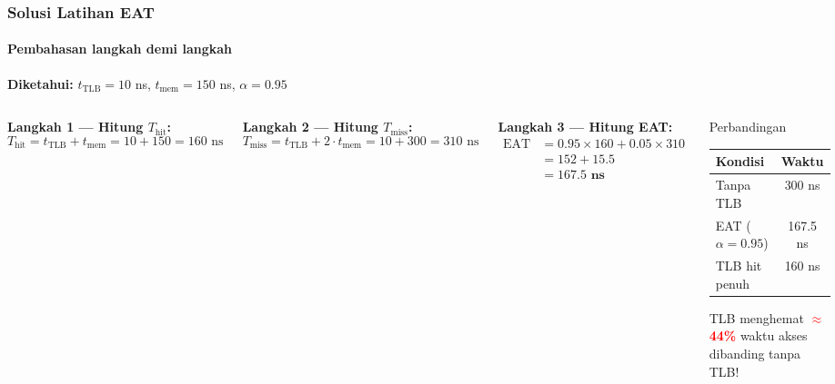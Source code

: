 \documentclass[t,aspectratio=169,xcolor=dvipsnames]{beamer}
\newcommand{\tem}[1]{\textbf{\textcolor{red}{#1}}}
\begin{document}
\begin{frame}
    \frametitle{Solusi Latihan EAT}
    \framesubtitle{Pembahasan langkah demi langkah}
    \small

    \textbf{Diketahui:} $t_{\text{TLB}} = 10$ ns, $t_{\text{mem}} = 150$ ns, $\alpha = 0.95$

    \vspace{0.2cm}
    \begin{columns}[T]
        \textbf{Langkah 1 — Hitung $T_{\text{hit}}$:}
        \[ T_{\text{hit}} = t_{\text{TLB}} + t_{\text{mem}} = 10 + 150 = 160 \text{ ns} \]

        \textbf{Langkah 2 — Hitung $T_{\text{miss}}$:}
        \[ T_{\text{miss}} = t_{\text{TLB}} + 2 \cdot t_{\text{mem}} = 10 + 300 = 310 \text{ ns} \]

        \textbf{Langkah 3 — Hitung EAT:}
        \begin{align*}
            \text{EAT} &= 0.95 \times 160 + 0.05 \times 310 \\
                       &= 152 + 15.5 \\
                       &= \mathbf{167.5 \text{ ns}}
        \end{align*}

        \begin{exampleblock}{Perbandingan}
            \begin{tabular}{lc}
                \hline
                \textbf{Kondisi} & \textbf{Waktu} \\
                \hline
                Tanpa TLB & 300 ns \\
                EAT ($\alpha=0.95$) & 167.5 ns \\
                TLB hit penuh & 160 ns \\
                \hline
            \end{tabular}

            \vspace{0.2cm}
            \footnotesize TLB menghemat \tem{$\approx$44\%} waktu akses dibanding tanpa TLB!
        \end{exampleblock}
    \end{columns}
\end{frame}
\end{document}
